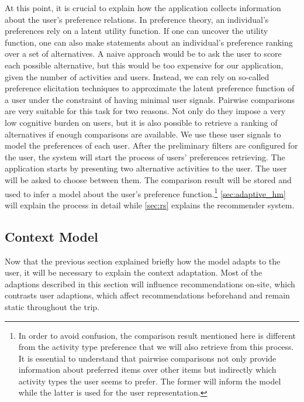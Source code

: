 \documentclass[11pt,a4paper,oneside]{article}
\begin{document}
At this point, it is crucial to explain how the application collects information about the user's preference relations. In preference theory, an individual's preferences rely on a latent utility function.\cite{chen_SurveyPreferenceElicitation_2004} If one can uncover the utility function, one can also make statements about an individual's preference ranking over a set of alternatives. A naive approach would be to ask the user to score each possible alternative, but this would be too expensive for our application, given the number of activities and users.\cite{chajewska_MakingRationalDecisions_2000} Instead, we can rely on so-called preference elicitation techniques to approximate the latent preference function of a user under the constraint of having minimal user signals. Pairwise comparisons are very suitable for this task for two reasons. Not only do they impose a very low cognitive burden on users, but it is also possible to retrieve a ranking of alternatives if enough comparisons are available.\cite{conitzer_ElicitingSinglePeakedPreferences_2009} We use these user signals to model the preferences of each user. After the preliminary filters are configured for the user, the system will start the process of users' preferences retrieving. The application starts by presenting two alternative activities to the user. The user will be asked to choose between them. The comparison result will be stored and used to infer a model about the user's preference function.\footnote{In order to avoid confusion, the comparison result mentioned here is different from the activity type preference that we will also retrieve from this process. It is essential to understand that pairwise comparisons not only provide information about preferred items over other items but indirectly which activity types the user seems to prefer. The former will inform the model while the latter is used for the user representation.} \autoref{sec:adaptive_hm} will explain the process in detail while \autoref{sec:rs} explains the recommender system. 


\subsection{Context Model}
\label{sec:context}
Now that the previous section explained briefly how the model adapts to the user, it will be necessary to explain the context adaptation. Most of the adaptions described in this section will influence recommendations on-site, which contrasts user adaptions, which affect recommendations beforehand and remain static throughout the trip.
\end{document}
